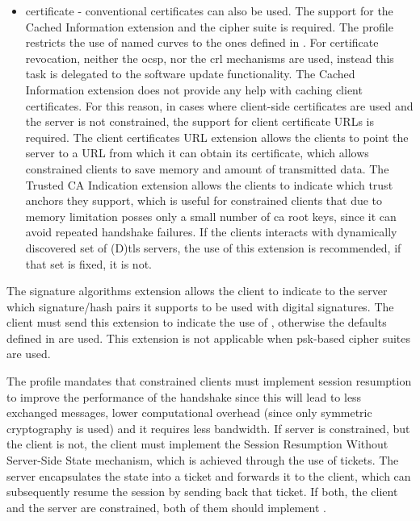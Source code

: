 \documentclass{llncs}
\begin{document}
{\begin{itemize}
  \item certificate - conventional certificates can also be used. The support
  for the Cached Information extension\cite{RFC7924} and the 
  cipher suite is required. The profile restricts the use of named curves to
  the ones defined in \cite{RFC4492}. For certificate revocation, neither the
  \gls{ocsp}\cite{RFC6960}, nor the \gls{crl}\cite{RFCabc} mechanisms are used, instead this task is delegated to
  the software update functionality. The Cached Information extension does not
  provide any help with caching client certificates. For this reason, in cases
  where client-side certificates are used and the server is not constrained,
  the support for client certificate URLs is required. The client certificates URL
  extension\cite{RFC4366} allows the clients to point the server to a URL from
  which it can obtain its certificate, which allows constrained clients to
  save memory and amount of transmitted data. The Trusted CA Indication\cite{RFC6066}
  extension allows the clients to indicate which trust anchors they support, which is useful
  for constrained clients that due to memory limitation posses only a small number
  of \gls{ca} root keys, since it can avoid repeated handshake failures. If the clients interacts with
  dynamically discovered set of (D)\gls{tls} servers, the use of this extension is recommended,
  if that set is fixed, it is not.

\end{itemize}

The signature algorithms extension\cite{RFC5246} allows the client to indicate
to the server which signature/hash pairs it supports to be used with digital signatures.
The client must send this extension to indicate the use of ,
otherwise the defaults defined in \cite{RFC5246} are used. This extension is not
applicable when \gls{psk}-based cipher suites are used.

The profile mandates that constrained clients must implement session
resumption to improve the performance of the handshake since this will lead to
less exchanged messages, lower computational overhead (since only symmetric cryptography
is used) and it requires less bandwidth. If server is constrained, but
the client is not, the client must implement the Session Resumption Without
Server-Side State mechanism\cite{RFC5077}, which is achieved through the
use of tickets. The server encapsulates the state into a ticket and forwards it to
the client, which can subsequently resume the session by sending back that ticket.
If both, the client and the server are constrained, both of them should implement
\cite{RFC5077}.

}
\end{document}
